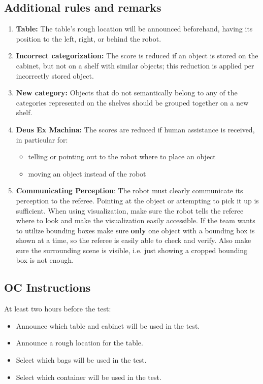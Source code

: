 \subsection*{Additional rules and remarks}
\begin{enumerate}
	\item \textbf{Table:} The table's rough location will be announced beforehand, having its position to the left, right, or behind the robot.
	\item \textbf{Incorrect categorization:} The score is reduced if an object is stored on the cabinet, but not on a shelf with similar objects; this reduction is applied per incorrectly stored object.
	\item \textbf{New category:} Objects that do not semantically belong to any of the categories represented on the shelves should be grouped together on a new shelf.
	\item \textbf{Deus Ex Machina:} The scores are reduced if human assistance is received, in particular for:
	\begin{itemize}
		\item telling or pointing out to the robot where to place an object
		\item moving an object instead of the robot
	\end{itemize}
	\item \textbf{Communicating Perception}: The robot must clearly communicate its perception to the referee.
	Pointing at the object or attempting to pick it up is sufficient.
	When using visualization, make sure the robot tells the referee where to look and make the visualization easily accessible. 
	If the team wants to utilize bounding boxes make sure \textbf{only} one object with a bounding box is shown at a time, so the referee is easily able to check and verify.
	Also make sure the surrounding scene is visible, i.e. just showing a cropped bounding box is not enough.
\end{enumerate}

\subsection*{OC Instructions}

At least two hours before the test:
\begin{itemize}
	\item Announce which table and cabinet will be used in the test.
	\item Announce a rough location for the table.
	\item Select which bags will be used in the test.
	\item Select which container will be used in the test.
\end{itemize}

